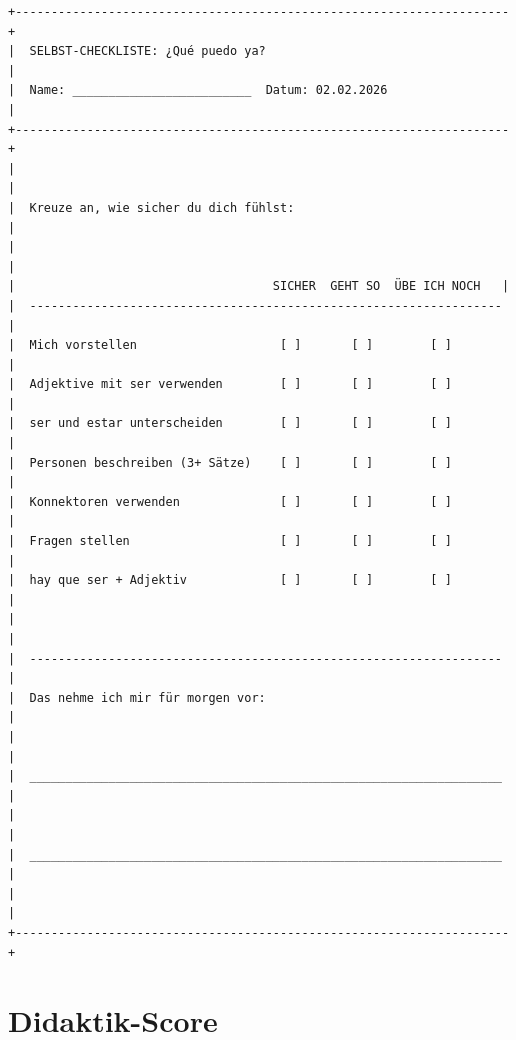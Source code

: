 \documentclass[11pt,a4paper]{article}
\begin{document}
\begin{verbatim}
+---------------------------------------------------------------------+
|  SELBST-CHECKLISTE: ¿Qué puedo ya?                                  |
|  Name: _________________________  Datum: 02.02.2026                 |
+---------------------------------------------------------------------+
|                                                                     |
|  Kreuze an, wie sicher du dich fühlst:                              |
|                                                                     |
|                                    SICHER  GEHT SO  ÜBE ICH NOCH   |
|  ------------------------------------------------------------------ |
|  Mich vorstellen                    [ ]       [ ]        [ ]        |
|  Adjektive mit ser verwenden        [ ]       [ ]        [ ]        |
|  ser und estar unterscheiden        [ ]       [ ]        [ ]        |
|  Personen beschreiben (3+ Sätze)    [ ]       [ ]        [ ]        |
|  Konnektoren verwenden              [ ]       [ ]        [ ]        |
|  Fragen stellen                     [ ]       [ ]        [ ]        |
|  hay que ser + Adjektiv             [ ]       [ ]        [ ]        |
|                                                                     |
|  ------------------------------------------------------------------ |
|  Das nehme ich mir für morgen vor:                                  |
|                                                                     |
|  __________________________________________________________________ |
|                                                                     |
|  __________________________________________________________________ |
|                                                                     |
+---------------------------------------------------------------------+
\end{verbatim}

\newpage
\section{Didaktik-Score}
\end{document}
